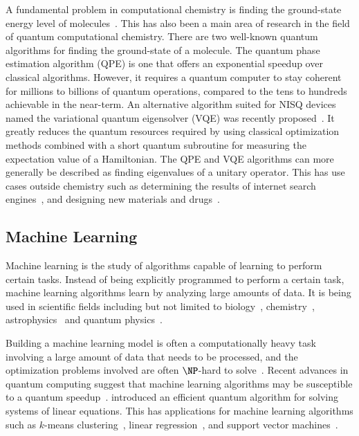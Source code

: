 \documentclass[twocolumn, switch]{article}
\begin{document}
    A fundamental problem in computational chemistry is finding the ground-state energy level of molecules~\cite{aspuru2005simulated}.
    This has also been a main area of research in the field of quantum computational chemistry.
    There are two well-known quantum algorithms for finding the ground-state of a molecule.
    The quantum phase estimation algorithm (QPE) is one that offers an exponential speedup over classical algorithms.
    However, it requires a quantum computer to stay coherent for millions to billions of quantum operations, compared to the tens to hundreds achievable in the near-term.
    An alternative algorithm suited for NISQ devices named the variational quantum eigensolver (VQE) was recently proposed~\cite{vqe}.
    It greatly reduces the quantum resources required by using classical optimization methods combined with a short quantum subroutine for measuring the expectation value of a Hamiltonian.
    The QPE and VQE algorithms can more generally be described as finding eigenvalues of a unitary operator.
    This has use cases outside chemistry such as determining the results of internet search engines~\cite{page1999pagerank}, and designing new materials and drugs~\cite{golub2000eigenvalue}.
    
    \subsection{Machine Learning}
    Machine learning is the study of algorithms capable of learning to perform certain tasks.
    Instead of being explicitly programmed to perform a certain task, machine learning algorithms learn by analyzing large amounts of data.
    It is being used in scientific fields including but not limited to biology~\cite{baldi2001bioinformatics}, chemistry~\cite{noordik2004cheminformatics}, astrophysics~\cite{baron2019machine} and quantum physics~\cite{torlai2017many}.
    
    Building a machine learning model is often a computationally heavy task involving a large amount of data that needs to be processed, and the optimization problems involved are often $\NP$-hard to solve~\cite{jain2017non}.
    Recent advances in quantum computing suggest that machine learning algorithms may be susceptible to a quantum speedup~\cite{lee2019experimental, gao2018quantum, yoo2014quantum, biamonte2017quantum}.
    \textcite{harrow2009quantum} introduced an efficient quantum algorithm for solving systems of linear equations.
    This has applications for machine learning algorithms such as $k$-means clustering~\cite{lloyd2013quantum}, linear regression~\cite{schuld2016prediction, yu2017improved}, and support vector machines~\cite{rebentrost2014quantum}.
    
\end{document}
